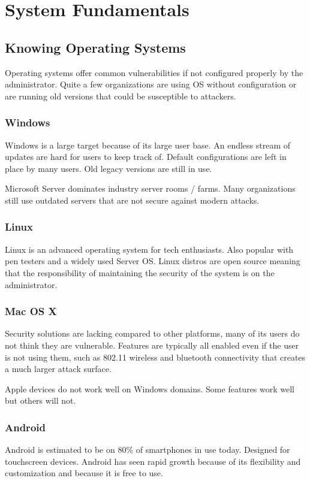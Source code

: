 \section{System Fundamentals}
\subsection{Knowing Operating Systems}
Operating systems offer common vulnerabilities if not configured properly by the administrator.
Quite a few organizations are using OS without configuration or are running old versions that could be susceptible to attackers.

\subsubsection{Windows}
Windows is a large target because of its large user base.
An endless stream of updates are hard for users to keep track of.
Default configurations are left in place by many users.
Old legacy versions are still in use.

Microsoft Server dominates industry server rooms / farms.
Many organizations still use outdated servers that are not secure against modern attacks.

\subsubsection{Linux}
Linux is an advanced operating system for tech enthusiasts. Also popular with pen testers and a widely used Server OS. Linux distros are open source meaning that the responsibility of maintaining the security of the system is on the administrator.

\subsubsection{Mac OS X}
Security solutions are lacking compared to other platforms, many of its users do not think they are vulnerable.
Features are typically all enabled even if the user is not using them, such as 802.11 wireless and bluetooth connectivity that creates a much larger attack surface.

Apple devices do not work well on Windows domains.
Some features work well but others will not.

\subsubsection{Android}
Android is estimated to be on 80\% of smartphones in use today.
Designed for touchscreen devices.
Android has seen rapid growth because of its flexibility and customization and because it is free to use.

